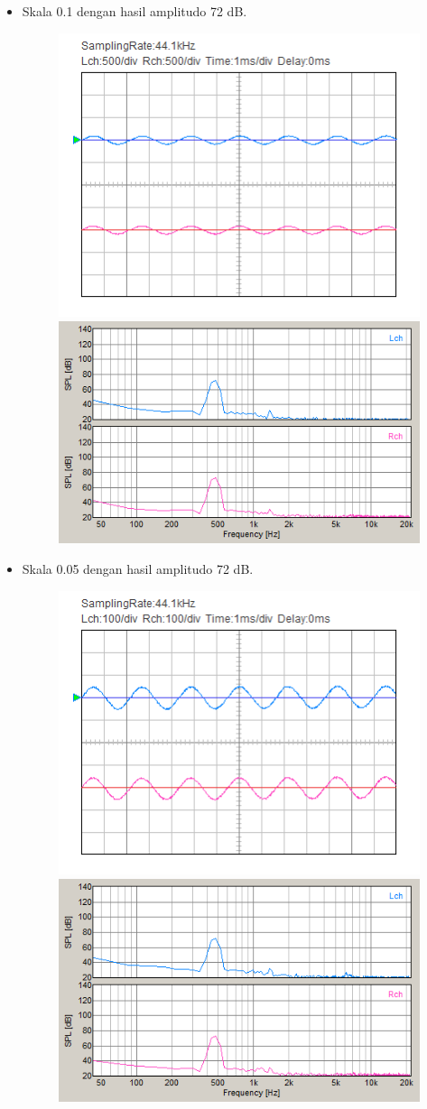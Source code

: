 \documentclass[12pt,]{article}
\begin{document}
\begin{itemize}
		\newpage
		\item Skala 0.1 dengan hasil amplitudo 72 dB.
		\begin{figure}[H]
			\centering
			\includegraphics[width=0.45\linewidth]{result/day_4/500Hz/tone01}
			\includegraphics[width=0.45\linewidth]{result/day_4/500Hz/fft_tone01}
		\end{figure}
	
		\item Skala 0.05 dengan hasil amplitudo 72 dB.
		\begin{figure}[H]
			\centering
			\includegraphics[width=0.45\linewidth]{result/day_4/500Hz/tone005}
			\includegraphics[width=0.45\linewidth]{result/day_4/500Hz/fft_tone005}
		\end{figure}
	

\end{itemize}
\end{document}
